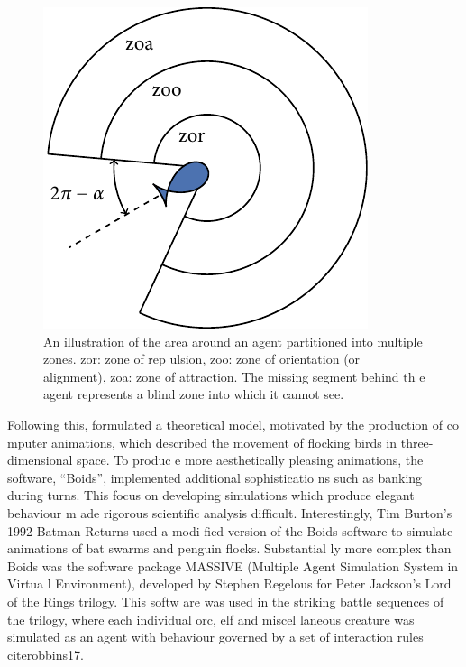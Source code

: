\begin{figure}[t]
	\includegraphics{zonal_tikz.pdf}
	\caption{An illustration of the area around an agent partitioned into multiple zones. zor: zone of rep
ulsion, zoo: zone of orientation (or alignment), zoa: zone of attraction. The missing segment behind th
e agent represents a blind zone into which it cannot see.}
	\label{fig:zone_illustration}
\end{figure}

Following this, \textcite{reynolds87} formulated a theoretical model, motivated by the production of co
mputer animations, which described the movement of flocking birds in three-dimensional space. To produc
e more aesthetically pleasing animations, the software, ``Boids'', implemented additional sophisticatio
ns such as banking during turns. This focus on developing simulations which produce elegant behaviour m
ade rigorous scientific analysis difficult. Interestingly, Tim Burton's 1992 Batman Returns used a modi
fied version of the Boids software to simulate animations of bat swarms and penguin flocks. Substantial
ly more complex than Boids was the software package MASSIVE (Multiple Agent Simulation System in Virtua
l Environment), developed by Stephen Regelous for Peter Jackson's Lord of the Rings trilogy. This softw
are was used in the striking battle sequences of the trilogy, where each individual orc, elf and miscel
laneous creature was simulated as an agent with behaviour governed by a set of interaction rules \paren
cite{robbins17}.

